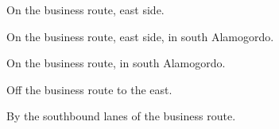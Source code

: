 
\begin{LocationList}

On the business route, east side.

On the business route, east side, in south Alamogordo.

On the business route, in south Alamogordo.

Off the business route to the east.

By the southbound lanes of the business route.

\end{LocationList}
